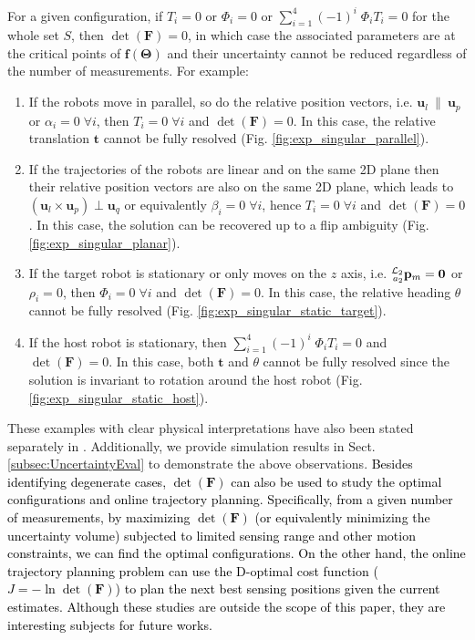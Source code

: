 \documentclass[journal]{IEEEtran}
\def\LocPosTarg{\prescript{\mathcal{L}_2}{a_2}{\mathbf{p}}} %
\def\StateVector{\mathbf{\Theta}}
\def\FIM{\mathbf{F}}
\def\detF{\det(\FIM)}
\begin{document}
For a given configuration, if $T_i = 0$ or $\Phi_i = 0$ or $\textstyle \sum_{i=1}^{4} (-1)^{i} \; \Phi_i T_i {=} 0$ for the whole set $S$, then $\detF = 0$, in which case the associated parameters are at the critical points of $\mathbf{f}(\StateVector)$ and their uncertainty cannot be reduced regardless of the number of measurements. For example:
\begin{enumerate}
    \item If the robots move in parallel, so do the relative position vectors, i.e. $\mathbf{u}_l \: \| \: \mathbf{u}_p$ or $\alpha_i = 0 \; \forall i$, then $T_i = 0 \; \forall i$ and $\detF=0$. In this case, the relative translation $\mathbf{t}$ cannot be fully resolved (Fig. \ref{fig:exp_singular_parallel}).
    \item If the trajectories of the robots are linear and on the same 2D plane then their relative position vectors are also on the same 2D plane, which leads to $(\mathbf{u}_l \times \mathbf{u}_p) \perp \mathbf{u}_q$ or equivalently $\beta_i = 0 \; \forall i$, hence $T_i = 0 \; \forall i$ and $\detF=0$. In this case, the solution can be recovered up to a flip ambiguity (Fig. \ref{fig:exp_singular_planar}).
    \item If the target robot is stationary or only moves on the $z$ axis, i.e. $\LocPosTarg_m = \mathbf{0}$ or $\rho_i = 0$, then $\Phi_i = 0 \; \forall i$ and $\detF=0$. In this case, the relative heading $\theta$ cannot be fully resolved (Fig. \ref{fig:exp_singular_static_target}).
    \item If the host robot is stationary, then $\textstyle \sum_{i=1}^{4} (-1)^{i} \; \Phi_i T_i = 0$ and $\detF=0$. In this case, both $\mathbf{t}$ and $\theta$ cannot be fully resolved since the solution is invariant to rotation around the host robot (Fig. \ref{fig:exp_singular_static_host}).
\end{enumerate}

These examples with clear physical interpretations have also been stated separately in \cite{van2019board,cornejo2015distributed}. Additionally, we provide simulation results in Sect. \ref{subsec:UncertaintyEval} to demonstrate the above observations. 
\textcolor{black}{Besides identifying degenerate cases, $\detF$ can also be used to study the optimal configurations and online trajectory planning. Specifically, from a given number of measurements, by maximizing $\det(\mathbf{F})$ (or equivalently minimizing the uncertainty volume) subjected to limited sensing range and other motion constraints, we can find the optimal configurations. On the other hand, the online trajectory planning problem can use the D-optimal cost function ($J = -\ln\det(\mathbf{F})$) to plan the next best sensing positions given the current estimates. Although these studies are outside the scope of this paper, they are interesting subjects for future works.
}
\end{document}
